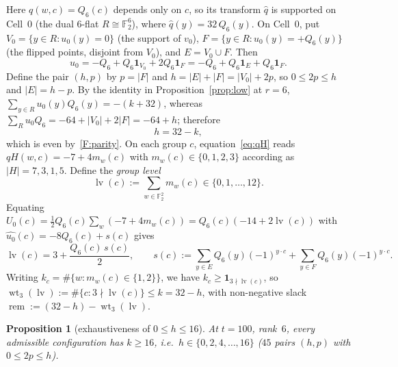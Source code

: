 \documentclass[11pt]{article}
\newtheorem{proposition}[theorem]{Proposition}
\theoremstyle{definition}
\theoremstyle{remark}
\newcommand{\F}{\mathbb{F}}
\newcommand{\wt}{\operatorname{wt}}
\newcommand{\ind}{\mathbf{1}}
\DeclareRobustCommand{\_}{\textunderscore\allowbreak}
\begin{document}
Here $q(w,c)=Q_6(c)$ depends only on $c$, so its transform $\widehat q$ is supported on Cell~$0$ (the dual $6$-flat $R\cong\F_2^6$), where $\widehat q(y)=32\,Q_6(y)$. On Cell~$0$, put $V_0=\{y\in R:u_0(y)=0\}$ (the support of $v_0$), $F=\{y\in R:u_0(y)=+Q_6(y)\}$ (the flipped points, disjoint from $V_0$), and $E=V_0\cup F$. Then
\[
  u_0=-Q_6+Q_6\ind_{V_0}+2Q_6\ind_F=-Q_6+Q_6\ind_E+Q_6\ind_F.
\]
Define the pair $(h,p)$ by $p=|F|$ and $h=|E|+|F|=|V_0|+2p$, so $0\le 2p\le h$ and $|E|=h-p$. By the identity in Proposition~\ref{prop:low} at $r=6$, $\sum_{y\in R}u_0(y)Q_6(y)=-(k+32)$, whereas $\sum_R u_0Q_6=-64+|V_0|+2|F|=-64+h$; therefore
\[
  h=32-k,
\]
which is even by~\ref{F:parity}. On each group $c$, equation~\eqref{eq:qH} reads $qH(w,c)=-7+4m_w(c)$ with $m_w(c)\in\{0,1,2,3\}$ according as $|H|=7,3,1,5$. Define the \emph{group level}
\[
  \operatorname{lv}(c):=\sum_{w\in\F_2^2}m_w(c)\in\{0,1,\dots,12\}.
\]
Equating $U_0(c)=\tfrac12Q_6(c)\sum_w(-7+4m_w(c))=Q_6(c)(-14+2\operatorname{lv}(c))$ with $\widehat{u_0}(c)=-8Q_6(c)+s(c)$ gives
\begin{equation}\label{eq:lv}
  \operatorname{lv}(c)=3+\frac{Q_6(c)\,s(c)}{2},\qquad
  s(c):=\sum_{y\in E}Q_6(y)(-1)^{y\cdot c}+\sum_{y\in F}Q_6(y)(-1)^{y\cdot c}.
\end{equation}
Writing $k_c=\#\{w:m_w(c)\in\{1,2\}\}$, we have $k_c\ge\ind_{3\nmid\operatorname{lv}(c)}$, so $\wt_3(\operatorname{lv}):=\#\{c:3\nmid\operatorname{lv}(c)\}\le k=32-h$, with non-negative slack $\operatorname{rem}:=(32-h)-\wt_3(\operatorname{lv})$.

\begin{proposition}[exhaustiveness of $0\le h\le16$]\label{prop:h-range}
At $t=100$, rank~$6$, every admissible configuration has $k\ge16$, i.e.\ $h\in\{0,2,4,\dots,16\}$ ($45$ pairs $(h,p)$ with $0\le 2p\le h$).
\end{proposition}
\end{document}
